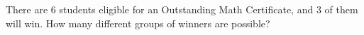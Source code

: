 There are $6$ students eligible for an Outstanding Math Certificate, and $3$ of them will win. How many different groups of winners are possible?
